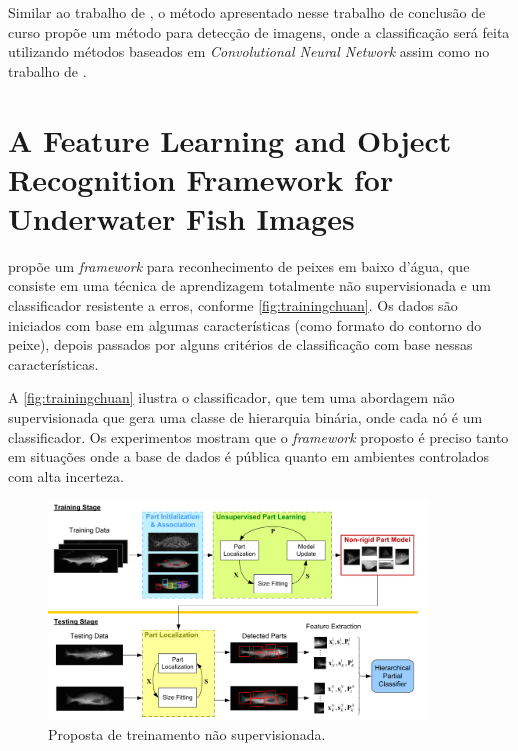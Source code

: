 Similar ao trabalho de , o método apresentado nesse trabalho de conclusão de curso propõe um método para detecção
de imagens, onde a classificação será feita utilizando métodos baseados em \textit{Convolutional Neural Network} assim como no trabalho de .


\section{A Feature Learning and Object Recognition Framework for Underwater Fish Images}

 propõe um \textit{framework} para reconhecimento de peixes em baixo d'água, que consiste em uma técnica de aprendizagem totalmente não supervisionada e um classificador resistente a erros, conforme \autoref{fig:trainingchuan}. Os dados são iniciados com base em algumas características (como formato do contorno do peixe), depois passados por alguns critérios de classificação com base nessas características. 

A \autoref{fig:trainingchuan} ilustra o classificador, que tem uma abordagem não supervisionada que gera uma classe de hierarquia binária, onde cada nó é um classificador. Os experimentos mostram que o \textit{framework} proposto é preciso tanto em situações onde a base de dados é pública quanto em ambientes controlados com alta incerteza.

\begin{figure}[h]
	\caption{\label{fig:trainingchuan}Proposta de treinamento não supervisionada.}
	\begin{center}
	    \includegraphics[width=0.9\textwidth]{resources/training}
	\end{center}
\end{figure}

